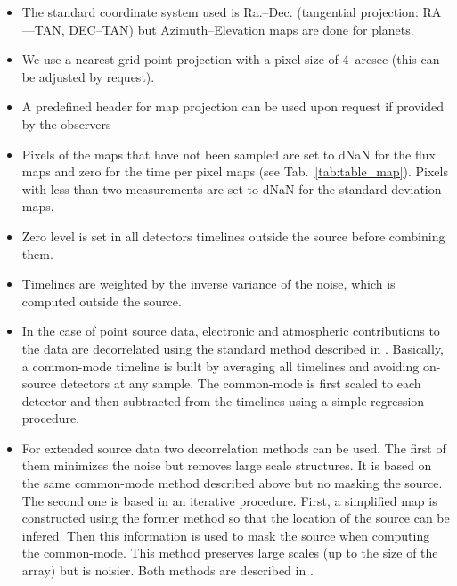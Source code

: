 \documentclass[a4paper,10pt]{article}
\begin{document}
\begin{itemize}
\item The standard coordinate system used is Ra.--Dec. (tangential projection:
  RA---TAN, DEC--TAN) but Azimuth--Elevation maps are done for planets.

\item We use a nearest grid point projection with a pixel size of 4~arcsec
  (this can be adjusted by request). 

\item A predefined header for map projection can be used upon request if
  provided by the observers

\item Pixels of the maps that have not been sampled are set to dNaN for the
  flux maps and zero for the time per pixel maps (see
  Tab.~\ref{tab:table_map}). Pixels with less than two measurements are set to
  dNaN for the standard deviation maps.

\item Zero level is set in all detectors timelines outside the source before
  combining them.

\item Timelines are weighted by the inverse variance of the noise, which is
  computed outside the source.

\item In the case of point source data, electronic and atmospheric
  contributions to the data are decorrelated using the standard method
  described in \cite{NIKA_abs_calib}. Basically, a common-mode timeline is
  built by averaging all timelines and avoiding on-source detectors at any
  sample.  The common-mode is first scaled to each detector and then
  subtracted from the timelines using a simple regression procedure.

\item For extended source data two decorrelation methods can be used. The
  first of them minimizes the noise but removes large scale structures. It is
  based on the same common-mode method described above but no masking the
  source. The second one is based in an iterative procedure. First, a
  simplified map is constructed using the former method so that the location
  of the source can be infered. Then this information is used to mask the
  source when computing the common-mode. This method preserves large scales
  (up to the size of the array) but is noisier. Both methods are described in
  \cite{NIKA_abs_calib}.

\end{itemize}
\end{document}
